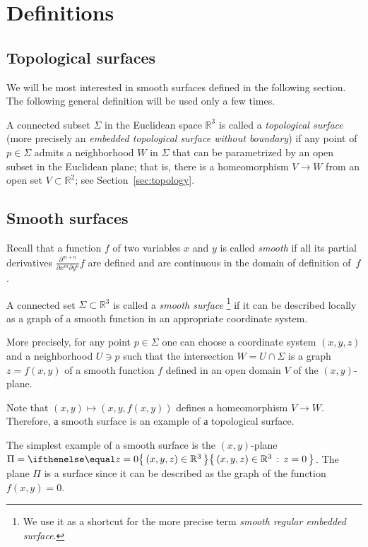\chapter{Definitions}
\label{chap:surfaces-def}

\section{Topological surfaces}

We will be most interested in smooth surfaces defined in the following section.
The following general definition will be used only a few times.

A connected subset $\Sigma$ in the Euclidean space $\mathbb{R}^3$
is called a \emph{topological surface} (more precisely an {}\emph{embedded topological surface without boundary}) 
if any point of $p\in \Sigma$ admits a neighborhood $W$ in $\Sigma$ 
that can be parametrized by an open subset in the Euclidean plane; 
that is, there is a homeomorphism $V\to W$ from an open set $V\subset \mathbb{R}^2$; see Section~\ref{sec:topology}.


\section{Smooth surfaces}\label{sec:def-smooth-surface}

Recall that a function $f$ of two variables $x$ and $y$ is called \emph{smooth} if all its partial derivatives $\frac{\partial^{m+n}}{\partial x^m\partial y^n}f$ are defined and are continuous in the domain of definition of~$f$. 

A connected set $\Sigma \subset \mathbb{R}^3$ is called a \emph{smooth surface}%
\footnote{We use it as a shortcut for the more precise term {}\emph{smooth regular embedded surface}.} if it can be described locally as a graph of a smooth function in an appropriate coordinate system.

More precisely, for any point $p\in \Sigma$ one can choose a coordinate system $(x,y,z)$ and a neighborhood $U\ni p$ such that
the intersection $W=U\cap \Sigma$ is a graph $z=f(x,y)$ of a smooth function $f$ defined in an open domain $V$ of the $(x,y)$-plane.

Note that $(x,y)\mapsto (x,y,f(x,y))$ defines a homeomorphism $V\to W$.
Therefore, а smooth surface is an example of а topological surface.

The simplest example of a smooth surface is the $(x,y)$-plane 
$\Pi=\set{(x,y,z)\in\mathbb{R}^3}{z=0}$.
The plane $\Pi$ is a surface since
it can be described as the graph of the function $f(x,y)=0$.

